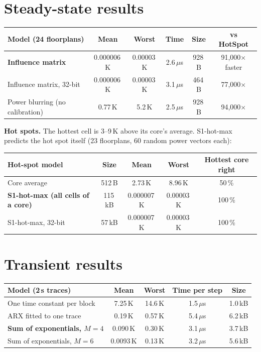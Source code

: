 \documentclass[11pt,a4paper]{article}
\newcommand{\us}{\,$\mu$s}
\begin{document}
\section{Steady-state results}
\begin{center}
\small
\begin{tabular}{@{}l c c c c c@{}}
\toprule
Model (24 floorplans) & Mean & Worst & Time & Size & vs HotSpot \\
\midrule
\textbf{Influence matrix} & 0.000006\,K & 0.00003\,K & 2.6\us & 928\,B & 91{,}000$\times$ faster \\
Influence matrix, 32-bit & 0.000006\,K & 0.00003\,K & 3.1\us & 464\,B & 77{,}000$\times$ \\
Power blurring (no calibration) & 0.77\,K & 5.2\,K & 2.5\us & 928\,B & 94{,}000$\times$ \\
\bottomrule
\end{tabular}
\end{center}
\textbf{Hot spots.} The hottest cell is 3--9\,K above its core's average.
S1-hot-max predicts the hot spot itself (23 floorplans, 60 random power vectors each):
\begin{center}
\small
\begin{tabular}{@{}l c c c c@{}}
\toprule
Hot-spot model & Size & Mean & Worst & Hottest core right \\
\midrule
Core average & 512\,B & 2.73\,K & 8.96\,K & 50\,\% \\
\textbf{S1-hot-max (all cells of a core)} & 115\,kB & 0.000007\,K & 0.00003\,K & 100\,\% \\
S1-hot-max, 32-bit & 57\,kB & 0.000007\,K & 0.00003\,K & 100\,\% \\
\bottomrule
\end{tabular}
\end{center}

\section{Transient results}
\begin{center}
\small
\begin{tabular}{@{}l c c c c@{}}
\toprule
Model (2\,s traces) & Mean & Worst & Time per step & Size \\
\midrule
One time constant per block & 7.25\,K & 14.6\,K & 1.5\us & 1.0\,kB \\
ARX fitted to one trace \cite{coskun,singla} & 0.19\,K & 0.57\,K & 5.4\us & 6.2\,kB \\
\textbf{Sum of exponentials, $M=4$} & 0.090\,K & 0.30\,K & 3.1\us & 3.7\,kB \\
Sum of exponentials, $M=6$ & 0.0093\,K & 0.13\,K & 3.2\us & 5.6\,kB \\
\bottomrule
\end{tabular}
\end{center}
\end{document}
